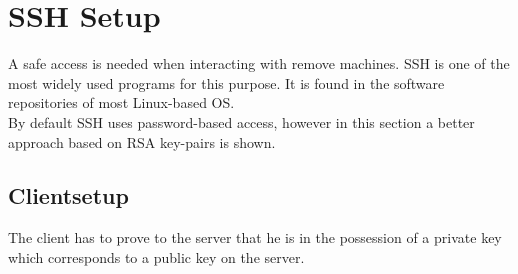 \newcommand{\code}[1]{\texttt{#1}}
\section{SSH Setup}
A safe access is needed when interacting with remove machines. SSH is one of the most widely used programs for this purpose. It is found in the software repositories of most Linux-based OS. \\
By default SSH uses password-based access, however in this section a better approach based on RSA key-pairs is shown.

\subsection{Clientsetup}
The client has to prove to the server that he is in the possession of a private key which corresponds to a public key on the server.
